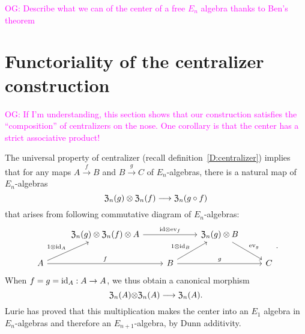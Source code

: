 \documentclass[11pt]{amsart}
\numberwithin{equation}{section}
\def\owen{\textcolor{magenta}{OG: }\textcolor{magenta}}
\begin{document}
\owen{Describe what we can of the center of a free $E_n$ algebra thanks to Ben's theorem}

\section{Functoriality of the centralizer construction}
\label{S:centerinFacAlg}

\owen{If I'm understanding, this section shows that our construction satisfies the ``composition'' of centralizers on the nose. One corollary is that the center has a strict associative product!}

The universal property of centralizer (recall definition~\ref{D:centralizer}) implies that 
for any maps $A\stackrel{f}\to B$ and $B\stackrel{g}\to C$ of $E_n$-algebras, 
there is a natural map of $E_n$-algebras
\begin{equation}
\label{eqdef:canonicaltocentralizers} 
{\frak Z}_n(g) \otimes {\frak Z}_n(f) \longrightarrow {\frak Z}_n(g\circ f)
\end{equation}
that arises from following commutative diagram of $E_n$-algebras:
\[
\begin{tikzcd}
&   {\frak Z}_n(g) \otimes  {\frak Z}_n(f) \otimes A \arrow[rr, "\id\otimes \ev_f"] &&  {\frak Z}_n(g) \otimes  B \arrow[dr, "\ev_g"]\\
A \arrow[ur, "1\otimes \id_A"] \arrow[rr, "f"] && B \arrow[rr, "g"] \arrow[ur, "1\otimes \id_B"] && C 
\end{tikzcd}.
\]
When $f=g={\rm id}_A:A\to A$, we thus obtain a canonical morphism 
\begin{equation} 
\label{eq:dgAssofcenter}
{\frak Z}_n(A){\otimes} {\frak Z}_n(A) \longrightarrow {\frak Z}_n(A).
\end{equation}
Lurie \cite{HA} has proved that this multiplication makes the center into an $E_1$ algebra in $E_n$-algebras 
and therefore an $E_{n+1}$-algebra, by Dunn additivity. 
%
\end{document}
